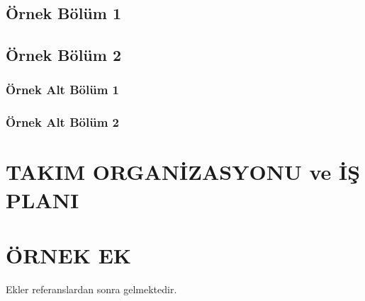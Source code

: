 \documentclass[a4paper,oneside,onecolumn,11pt]{report}
\begin{document}
\section{Örnek Bölüm 1}
\label{section:ornek_bolum_1}

\section{Örnek Bölüm 2}
\label{section:ornek_bolum_2}

\subsection{Örnek Alt Bölüm 1}
\label{subsection:ornek_alt_bolum_1}

\subsection{Örnek Alt Bölüm 2}
\label{subsection:ornek_alt_bolum_2}

\chapter{TAKIM ORGANİZASYONU ve İŞ PLANI}
\label{chapter:takim_organizasyonu_ve_is_plani}



\renewcommand\bibname{KAYNAKÇA}

\appendix
\chapter[ÖRNEK EK]{ÖRNEK EK}
Ekler referanslardan sonra gelmektedir.
\end{document}
